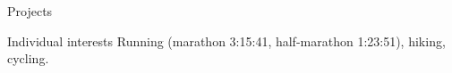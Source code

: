 \documentclass{resume} %
\begin{document}
\begin{rSection}{Projects}
\end{rSection}

\begin{rSection}{Individual interests}
Running (marathon 3:15:41, half-marathon 1:23:51), hiking, cycling.
\end{rSection}
\end{document}
